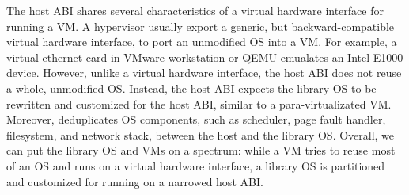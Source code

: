 The host ABI shares several characteristics of a virtual hardware interface for running a VM.
A hypervisor usually export a generic, but backward-compatible
virtual hardware interface,
to port an unmodified OS into a VM.
For example, a virtual ethernet card in VMware workstation or QEMU
emualates an Intel E1000 device.
However, unlike a virtual hardware interface, the host ABI does not reuse a whole, unmodified OS.
Instead, the host ABI expects the library OS
to be rewritten and
customized for the host ABI,
similar to a 
para-virtualizated VM.
Moreover, \graphene{} deduplicates OS components,
such as scheduler, page fault handler, filesystem, and network stack,
between the host and the library OS.
Overall, we can put the \graphene{} library OS and VMs on a spectrum:
while a VM tries to reuse most of an OS and runs on a virtual hardware interface,
a library OS
is partitioned and customized
for running on a narrowed host ABI.




